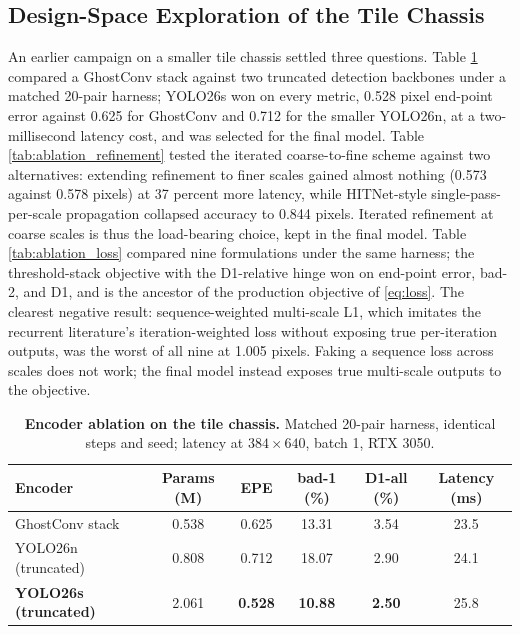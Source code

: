 \FloatBarrier
\subsection{Design-Space Exploration of the Tile Chassis}
An earlier campaign on a smaller tile chassis settled three questions.
Table \ref{tab:ablation_encoder} compared a GhostConv stack against two
truncated detection backbones under a matched 20-pair harness; YOLO26s
won on every metric, 0.528 pixel end-point error against 0.625 for
GhostConv and 0.712 for the smaller YOLO26n, at a two-millisecond latency
cost, and was selected for the final model. Table
\ref{tab:ablation_refinement} tested the iterated coarse-to-fine scheme
against two alternatives: extending refinement to finer scales gained
almost nothing (0.573 against 0.578 pixels) at 37 percent more latency,
while HITNet-style single-pass-per-scale propagation collapsed accuracy
to 0.844 pixels. Iterated refinement at coarse scales is thus the
load-bearing choice, kept in the final model. Table
\ref{tab:ablation_loss} compared nine formulations under the same
harness; the threshold-stack objective with the D1-relative hinge won on
end-point error, bad-2, and D1, and is the ancestor of the production
objective of \eqref{eq:loss}. The clearest negative result:
sequence-weighted multi-scale L1, which imitates the recurrent
literature's iteration-weighted loss without exposing true per-iteration
outputs, was the worst of all nine at 1.005 pixels. Faking a sequence
loss across scales does not work; the final model instead exposes true
multi-scale outputs to the objective.

\begin{table}[!htbp]
\centering
\caption{\textbf{Encoder ablation on the tile chassis.} Matched 20-pair harness, identical steps and seed; latency at $384\times 640$, batch 1, RTX 3050.}
\label{tab:ablation_encoder}
\small
\begin{tabular}{lccccc}
\toprule
Encoder & Params (M) & EPE & bad-1 (\%) & D1-all (\%) & Latency (ms)\\
\midrule
GhostConv stack & 0.538 & 0.625 & 13.31 & 3.54 & 23.5\\
YOLO26n (truncated) & 0.808 & 0.712 & 18.07 & 2.90 & 24.1\\
\textbf{YOLO26s (truncated)} & 2.061 & \textbf{0.528} & \textbf{10.88} & \textbf{2.50} & 25.8\\
\bottomrule
\end{tabular}
\end{table}

